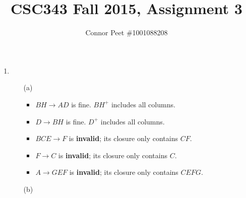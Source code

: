\documentclass{article}
\title{CSC343 Fall 2015, Assignment 3}
\author{Connor Peet \#1001088208}
\begin{document}
\maketitle

\begin{enumerate}
\item
    \begin{enumerate}
    \item [(a)]
        \begin{itemize}
        \item $BH \rightarrow AD$ is fine. $BH^+$ includes all columns.
        \item $D \rightarrow BH$ is fine. $D^+$ includes all columns.
        \item $BCE \rightarrow F$ is \textbf{invalid}; its closure only contains $CF$.
        \item $F \rightarrow C$ is \textbf{invalid}; its closure only contains $C$.
        \item $A \rightarrow GEF$ is \textbf{invalid}; its closure only contains $CEFG$.
        \end{itemize}
    \item [(b)]
\end{enumerate}
\end{enumerate}
\end{document}
